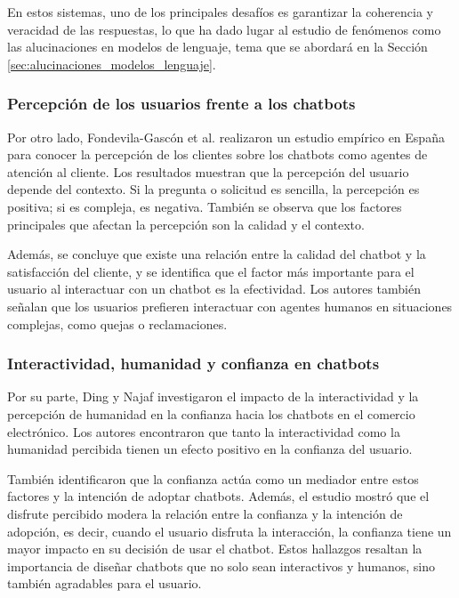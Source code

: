 En estos sistemas, uno de los principales desafíos es garantizar la coherencia y veracidad de las respuestas, lo que ha dado lugar al estudio de fenómenos como las alucinaciones en modelos de lenguaje, tema que se abordará en la Sección \ref{sec:alucinaciones_modelos_lenguaje}.

\subsubsection{Percepción de los usuarios frente a los chatbots}
\label{subsec:percepcion_chatbots}

Por otro lado, Fondevila-Gascón et al. \cite{fondevila2024chatbot} realizaron un estudio empírico en España para conocer la percepción de los clientes sobre los chatbots como agentes de atención al cliente. Los resultados muestran que la percepción del usuario depende del contexto. Si la pregunta o solicitud es sencilla, la percepción es positiva; si es compleja, es negativa. También se observa que los factores principales que afectan la percepción son la calidad y el contexto.

Además, se concluye que existe una relación entre la calidad del chatbot y la satisfacción del cliente, y se identifica que el factor más importante para el usuario al interactuar con un chatbot es la efectividad. Los autores también señalan que los usuarios prefieren interactuar con agentes humanos en situaciones complejas, como quejas o reclamaciones.

\subsubsection{Interactividad, humanidad y confianza en chatbots}
\label{subsec:confianza_chatbots}

Por su parte, Ding y Najaf \cite{ding2024interactivity} investigaron el impacto de la interactividad y la percepción de humanidad en la confianza hacia los chatbots en el comercio electrónico. Los autores encontraron que tanto la interactividad como la humanidad percibida tienen un efecto positivo en la confianza del usuario.

También identificaron que la confianza actúa como un mediador entre estos factores y la intención de adoptar chatbots. Además, el estudio mostró que el disfrute percibido modera la relación entre la confianza y la intención de adopción, es decir, cuando el usuario disfruta la interacción, la confianza tiene un mayor impacto en su decisión de usar el chatbot. Estos hallazgos resaltan la importancia de diseñar chatbots que no solo sean interactivos y humanos, sino también agradables para el usuario.

